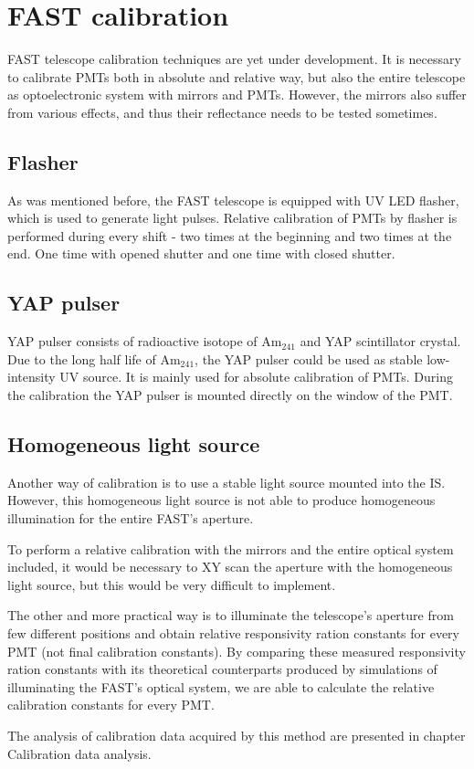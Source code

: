 \section{FAST calibration}
FAST telescope calibration techniques are yet under development. It is necessary to calibrate PMTs both in absolute and relative way, but also the entire telescope as optoelectronic system with mirrors and PMTs. However, the mirrors also suffer from various effects, and thus their reflectance needs to be tested sometimes.
\subsection{Flasher}
As was mentioned before, the FAST telescope is equipped with UV LED flasher, which is used to generate light pulses. Relative calibration of PMTs by flasher is performed during every shift - two times at the beginning and two times at the end. One time with opened shutter and one time with closed shutter.
\subsection{YAP pulser}
YAP pulser consists of radioactive isotope of $\textrm{Am}_{241}$ and YAP scintillator crystal. Due to the long half life of $\textrm{Am}_{241}$, the YAP pulser could be used as stable low-intensity UV source. 
It is mainly used for absolute calibration of PMTs. During the calibration the YAP pulser is mounted directly on the window of the PMT.

\subsection{Homogeneous light source}
Another way of calibration is to use a stable light source mounted into the IS. However, this homogeneous light source is not able to produce homogeneous illumination for the entire FAST's aperture.  
\par
To perform a relative calibration with the mirrors and the entire optical system included, it would be necessary to XY scan the aperture with the homogeneous light source, but this would be very difficult to implement.   

\par
The other and more practical way is to illuminate the telescope's aperture from few different positions and obtain relative responsivity ration constants for every PMT (not final calibration constants). By comparing these measured responsivity ration constants with its theoretical counterparts produced by simulations of illuminating the FAST's optical system, we are able to calculate the relative calibration constants for every PMT.       
\par
The analysis of calibration data acquired by this method are presented in chapter Calibration data analysis.

